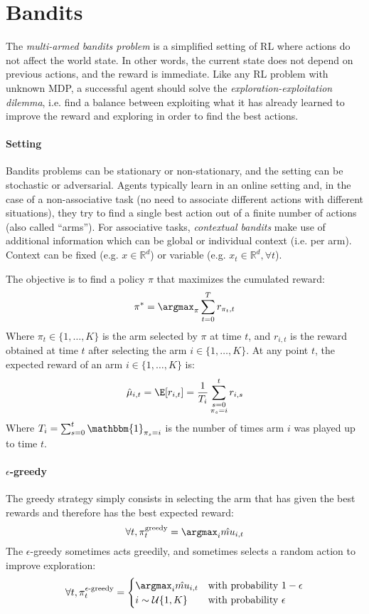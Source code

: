 \section{Bandits}
The \emph{multi-armed bandits problem} is a simplified setting of RL where actions do not affect the world state. In other words, the current state does not depend on previous actions, and the reward is immediate. Like any RL problem with unknown MDP, a successful agent should solve the \emph{exploration-exploitation dilemma}, i.e. find a balance between exploiting what it has already learned to improve the reward and exploring in order to find the best actions.

\paragraph{Setting}
Bandits problems can be stationary or non-stationary, and the setting can be stochastic or adversarial. Agents typically learn in an online setting and, in the case of a non-associative task (no need to associate different actions with different situations), they try to find a single best action out of a finite number of actions (also called “arms”). For associative tasks, \emph{contextual bandits} make use of additional information which can be global or individual context (i.e. per arm). Context can be fixed (e.g. $x\in \mathbb{R}^d$) or variable (e.g. $x_t\in \mathbb{R}^d, \forall t$).

The objective is to find a policy $\pi$ that maximizes the cumulated reward:
\[
    \pi^* = \argmax_\pi \sum_{t=0}^T r_{\pi_t, t}
\]
Where $\pi_t \in \{1, \dots, K\}$ is the arm selected by $\pi$ at time $t$, and $r_{i,t}$ is the reward obtained at time $t$ after selecting the arm $i \in \{1, \dots, K\}$. At any point $t$, the expected reward of an arm $i \in \{1, \dots, K\}$ is:
\[
    \hat{\mu}_{i,t} = \E[r_{i,t}] = \frac{1}{T_i} \sum_{\substack{s=0 \\ \pi_s=i}}^t r_{i,s}
\]
Where $T_i = \sum_{s=0}^t \mathbbm{1}_{\pi_s=i}$ is the number of times arm $i$ was played up to time $t$.

\paragraph{$\epsilon$-greedy}
The greedy strategy simply consists in selecting the arm that has given the best rewards and therefore has the best expected reward:
\[
    \forall t, \pi_t^\text{greedy} = \argmax_i \hat{mu}_{i,t}
\]
The $\epsilon$-greedy sometimes acts greedily, and sometimes selects a random action to improve exploration:
\[
    \forall t, \pi_t^\text{$\epsilon$-greedy} = \begin{cases}
        \argmax_i \hat{mu}_{i,t} & \text{with probability $1-\epsilon$} \\
        i \sim \mathcal{U}\{1,K\} & \text{with probability $\epsilon$}
    \end{cases}
\]

